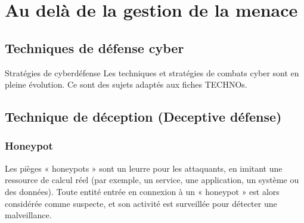 


\section{Au delà de la gestion de la menace}

\subsection{Techniques de défense cyber}

\begin{warningbox}{Stratégies de cyberdéfense}
Les techniques et stratégies de combats cyber sont en pleine évolution. Ce sont des sujets adaptés aux fiches TECHNOs.
\end{warningbox}


\subsection{Technique de déception (Deceptive défense)}

\subsubsection{Honeypot}

Les pièges « honeypots » sont un leurre pour les attaquants, en imitant une ressource de calcul réel (par exemple, un service, une application, un système ou des données). Toute entité entrée en connexion à un « honeypot » est alors considérée comme suspecte, et son activité est surveillée pour détecter une malveillance.


